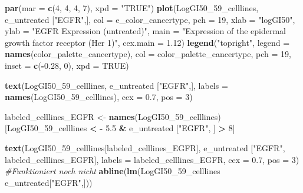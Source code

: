 \documentclass[]{article}
\newenvironment{Shaded}{\begin{snugshade}}{\end{snugshade}}
\newcommand{\CommentTok}[1]{\textcolor[rgb]{0.56,0.35,0.01}{\textit{#1}}}
\newcommand{\DataTypeTok}[1]{\textcolor[rgb]{0.13,0.29,0.53}{#1}}
\newcommand{\DecValTok}[1]{\textcolor[rgb]{0.00,0.00,0.81}{#1}}
\newcommand{\FloatTok}[1]{\textcolor[rgb]{0.00,0.00,0.81}{#1}}
\newcommand{\KeywordTok}[1]{\textcolor[rgb]{0.13,0.29,0.53}{\textbf{#1}}}
\newcommand{\NormalTok}[1]{#1}
\newcommand{\OperatorTok}[1]{\textcolor[rgb]{0.81,0.36,0.00}{\textbf{#1}}}
\newcommand{\OtherTok}[1]{\textcolor[rgb]{0.56,0.35,0.01}{#1}}
\newcommand{\StringTok}[1]{\textcolor[rgb]{0.31,0.60,0.02}{#1}}
\begin{document}
\begin{Shaded}
\begin{Highlighting}[]
\KeywordTok{par}\NormalTok{(}\DataTypeTok{mar =} \KeywordTok{c}\NormalTok{(}\DecValTok{4}\NormalTok{, }\DecValTok{4}\NormalTok{, }\DecValTok{4}\NormalTok{, }\DecValTok{7}\NormalTok{), }\DataTypeTok{xpd =} \StringTok{"TRUE"}\NormalTok{)}
\KeywordTok{plot}\NormalTok{(LogGI50_}\DecValTok{59}\NormalTok{_celllines, e_untreated [}\StringTok{"EGFR"}\NormalTok{,], }
      \DataTypeTok{col =}\NormalTok{ e_color_cancertype, }
      \DataTypeTok{pch =} \DecValTok{19}\NormalTok{, }
     \DataTypeTok{xlab =} \StringTok{"logGI50"}\NormalTok{, }
     \DataTypeTok{ylab =} \StringTok{"EGFR Expression (untreated)"}\NormalTok{,        }
     \DataTypeTok{main =} \StringTok{"Expression of the epidermal growth factor receptor (Her 1)"}\NormalTok{,}
     \DataTypeTok{cex.main =} \FloatTok{1.12}\NormalTok{)}
\KeywordTok{legend}\NormalTok{(}\StringTok{"topright"}\NormalTok{, }
    \DataTypeTok{legend =} \KeywordTok{names}\NormalTok{(color_palette_cancertype), }
    \DataTypeTok{col =}\NormalTok{ color_palette_cancertype, }
    \DataTypeTok{pch =} \DecValTok{19}\NormalTok{,}
    \DataTypeTok{inset =} \KeywordTok{c}\NormalTok{(}\OperatorTok{-}\FloatTok{0.28}\NormalTok{, }\DecValTok{0}\NormalTok{),}
    \DataTypeTok{xpd =} \OtherTok{TRUE}\NormalTok{)}

\KeywordTok{text}\NormalTok{(LogGI50_}\DecValTok{59}\NormalTok{_celllines, e_untreated [}\StringTok{"EGFR"}\NormalTok{,], }
     \DataTypeTok{labels  =} \KeywordTok{names}\NormalTok{(LogGI50_}\DecValTok{59}\NormalTok{_celllines),}
     \DataTypeTok{cex =} \FloatTok{0.7}\NormalTok{, }
     \DataTypeTok{pos =} \DecValTok{3}\NormalTok{)}

\NormalTok{labeled_celllines_EGFR <-}\StringTok{ }\KeywordTok{names}\NormalTok{(LogGI50_}\DecValTok{59}\NormalTok{_celllines)[LogGI50_}\DecValTok{59}\NormalTok{_celllines }\OperatorTok{<}\StringTok{ }\OperatorTok{-}\StringTok{ }\FloatTok{5.5}
                                                        \OperatorTok{&}\StringTok{ }\NormalTok{e_untreated [}\StringTok{"EGFR"}\NormalTok{, ] }\OperatorTok{>}\StringTok{ }\DecValTok{8}\NormalTok{]}

\KeywordTok{text}\NormalTok{(LogGI50_}\DecValTok{59}\NormalTok{_celllines[labeled_celllines_EGFR], e_untreated [}\StringTok{"EGFR"}\NormalTok{, labeled_celllines_EGFR], }
     \DataTypeTok{labels =}\NormalTok{ labeled_celllines_EGFR,}
     \DataTypeTok{cex =} \FloatTok{0.7}\NormalTok{,}
     \DataTypeTok{pos =} \DecValTok{3}\NormalTok{)}
\CommentTok{#Funktioniert noch nicht}
\KeywordTok{abline}\NormalTok{(}\KeywordTok{lm}\NormalTok{(LogGI50_}\DecValTok{59}\NormalTok{_celllines }\OperatorTok{~}\StringTok{ }\NormalTok{e_untreated[}\StringTok{"EGFR"}\NormalTok{,]))}
\end{Highlighting}
\end{Shaded}
\end{document}
